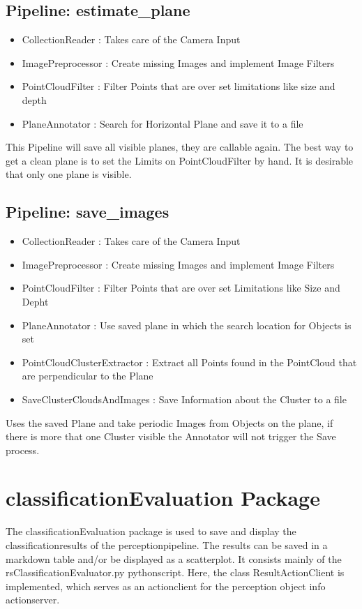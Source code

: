\documentclass[main.tex]{subfiles}
\begin{document}
			\subsection{Pipeline: estimate\_plane}
\begin{itemize}
	\item CollectionReader : Takes care of the Camera  Input
	\item ImagePreprocessor : Create missing Images and implement Image Filters  
	\item PointCloudFilter : Filter Points that are over set limitations like size and depth
	\item PlaneAnnotator : Search for Horizontal Plane and save it to a file 
\end{itemize}
This Pipeline will save all visible planes, they are callable again. The best way to get a clean plane is to set the Limits on PointCloudFilter by hand. It is desirable that only one plane is visible. 

			\subsection{Pipeline: save\_images}
\begin{itemize}
	\item CollectionReader : Takes care of the Camera  Input
	\item ImagePreprocessor : Create missing Images and implement Image Filters  
	\item PointCloudFilter : Filter Points that are over set Limitations like Size and Depht
	\item PlaneAnnotator : Use saved plane in which the search location for Objects is set
	\item PointCloudClusterExtractor : Extract all Points found in the PointCloud that are perpendicular to the Plane 
	\item SaveClusterCloudsAndImages : Save Information about the Cluster to a file 
\end{itemize}
Uses the saved Plane and take periodic Images from Objects on the plane, if there is more that one Cluster visible the Annotator will not trigger the Save process.

\section{classificationEvaluation Package}

The classificationEvaluation package is used to save and display the classificationresults of the perceptionpipeline. The results can be saved in a markdown table and/or be displayed as a scatterplot. It consists mainly of the rsClassificationEvaluator.py pythonscript. Here, the class ResultActionClient is implemented, which serves as an actionclient for the perception object info actionserver.\\
\end{document}
